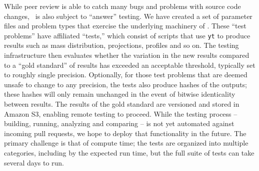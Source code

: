 While peer review is able to catch many bugs and problems with source
code changes, \enzo\ is also subject to ``answer'' testing.  We have
created a set of parameter files and problem types that exercise the
underlying machinery of \enzo.  These ``test problems'' have
affiliated ``tests,'' which consist of scripts that use \texttt{yt}
\citep{2011ApJS..192....9T} to produce results such as mass
distribution, projections, profiles and so on.  The testing
infrastructure then evaluates whether the variation in the new results
compared to a ``gold standard'' of results has exceeded an acceptable
threshold, typically set to roughly single precision.  Optionally, for
those test problems that are deemed unsafe to change to any precision,
the tests also produce hashes of the outputs; these hashes will only
remain unchanged in the event of bitwise identicality between results.
The results of the gold standard are versioned and stored in Amazon
S3, enabling remote testing to proceed.  While the testing process --
building, running, analyzing and comparing -- is not yet automated
against incoming pull requests, we hope to deploy that functionality
in the future.  The primary challenge is that of compute time; the
tests are organized into multiple categories, including by the
expected run time, but the full suite of tests can take several days
to run.
